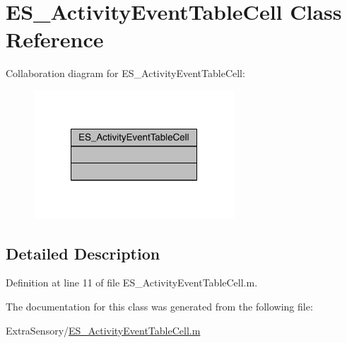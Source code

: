 \hypertarget{class_e_s___activity_event_table_cell}{\section{E\+S\+\_\+\+Activity\+Event\+Table\+Cell Class Reference}
\label{class_e_s___activity_event_table_cell}
}


Collaboration diagram for E\+S\+\_\+\+Activity\+Event\+Table\+Cell\+:\nopagebreak
\begin{figure}[H]
\begin{center}
\leavevmode
\includegraphics[width=212pt]{df/dc9/class_e_s___activity_event_table_cell__coll__graph}
\end{center}
\end{figure}


\subsection{Detailed Description}


Definition at line 11 of file E\+S\+\_\+\+Activity\+Event\+Table\+Cell.\+m.



The documentation for this class was generated from the following file\+:\begin{DoxyCompactItemize}
\item 
Extra\+Sensory/\hyperlink{_e_s___activity_event_table_cell_8m}{E\+S\+\_\+\+Activity\+Event\+Table\+Cell.\+m}\end{DoxyCompactItemize}

